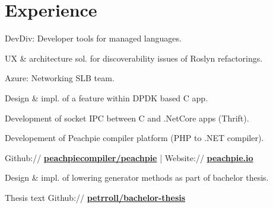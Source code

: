 \documentclass[a4paper]{deedy-resume} %
\begin{document}
\hfill
%
%
\begin{minipage}[t]{0.62\textwidth} %


\section{Experience}


\vspace{\topsep} %
\begin{tightitemize}
\item DevDiv: Developer tools for managed languages.
\item UX \& architecture sol. for discoverability issues of Roslyn refactorings.
\end{tightitemize}

\begin{tightitemize}
\item Azure: Networking SLB team.
\item Design \& impl. of a feature within DPDK based C app.
\item Development of socket IPC between C and .NetCore apps (Thrift).
\end{tightitemize}

\sectionspace %



\begin{tightitemize}
\item Developement of Peachpie compiler platform (PHP to .NET compiler).
\item Github:// \href{https://github.com/peachpiecompiler/peachpie}{\bf peachpiecompiler/peachpie} | Website:// \href{https://www.peachpie.io/}{\bf peachpie.io}
\item Design \& impl. of lowering generator methods as part of bachelor thesis.
\item Thesis text Github:// \href{https://github.com/petrroll/bachelor-thesis}{\bf petrroll/bachelor-thesis}
\end{tightitemize}


\end{minipage}
\end{document}
